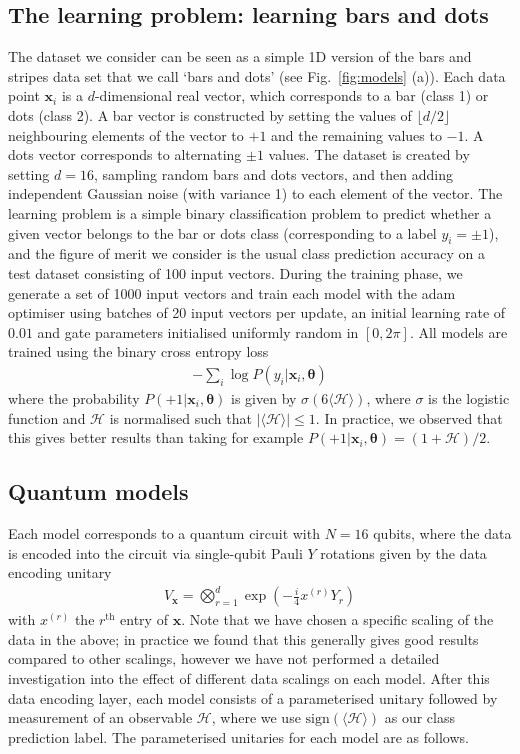 \documentclass[a4paper,twocolumn,11pt,accepted=2025-09-06]{quantumarticle}
\renewcommand{\vec}{\boldsymbol}
\begin{document}
\subsection{The learning problem: learning bars and dots}
The dataset we consider can be seen as a simple 1D version of the bars and stripes data set that we call `bars and dots' (see Fig.\ \ref{fig:models} (a)). Each data point $\vec{x}_i$ is a $d$-dimensional real vector, which corresponds to a bar (class 1) or dots (class 2). A bar vector is constructed by setting the values of $\lfloor d/2 \rfloor$ neighbouring elements of the vector to $+1$ and the remaining values to $-1$. A dots vector corresponds to alternating $\pm1$ values. The dataset is created by setting $d=16$, sampling random bars and dots vectors, and then adding independent Gaussian noise (with variance 1) to each element of the vector. The learning problem is a simple binary classification problem to predict whether a given vector belongs to the bar or dots class (corresponding to a label $y_i=\pm1$), and the figure of merit we consider is the usual class prediction accuracy on a test dataset consisting of 100 input vectors. During the training phase, we generate a set of 1000 input vectors and train each model with the adam optimiser using batches of 20 input vectors per update, an initial learning rate of $0.01$ and gate parameters initialised uniformly random in $[0,2\pi]$. All models are trained using the binary cross entropy loss
%
\begin{align}
    - \sum_i \log P(y_i\vert \vec{x}_i, \vec{\theta})
\end{align}
%
where the probability $P(+1\vert \vec{x}_i, \vec{\theta})$ is given by $\sigma(6\langle \mathcal{H} \rangle)$, where $\sigma$ is the logistic function and $\mathcal{H}$ is normalised such that $\vert\langle \mathcal{H} \rangle\vert\leq 1 $. In practice, we observed that this gives better results than taking for example $P(+1\vert \vec{x}_i, \vec{\theta})=(1+\mathcal{H})/2$. 

\subsection{Quantum models}
Each model corresponds to a quantum circuit with $N=16$ qubits, where the data is encoded into the circuit via single-qubit Pauli $Y$ rotations given by the data encoding unitary
%
\begin{align}
    V_{\vec{x}} = \bigotimes_{r=1}^d 
    \exp\left(-\frac{i}{4}x^{(r)} Y_r\right)
\end{align}
%
with $x^{(r)}$ the $r^{\text{th}}$ entry of $\vec{x}$. Note that we have chosen a specific scaling of the data in the above; in practice we found that this generally gives good results compared to other scalings, however we have not performed a detailed investigation into the effect of different data scalings on each model. After this data encoding layer, each model consists of a parameterised unitary followed by measurement of an observable $\mathcal{H}$, where we use $\text{sign}(\langle\mathcal{H}\rangle)$ as our class prediction label. The parameterised unitaries for each model are as follows. 
\end{document}

